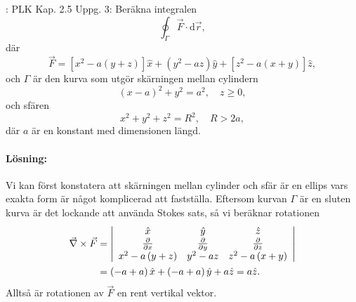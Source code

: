 \documentclass[%
oneside,                 %
final,                   %
10pt]{article}
\newcommand{\shortinlinecomment}[3]{{\color{red}{\bf #1}: #2}}
\newenvironment{notice_mdfboxadmon}[1][]{
\begin{notice_mdfboxmdframed}[frametitle=#1]
}
{
\end{notice_mdfboxmdframed}
}
\begin{document}
\begin{notice_mdfboxadmon}

\shortinlinecomment{Kommentar 2}{ PLK Kap. 2.5 Uppg. 3: }{ PLK Kap. 2.5 Uppg. }  Beräkna integralen
\begin{equation}
  \oint_\Gamma \vec{F} \cdot \mbox{d}\vec{r},
\end{equation}
där 
\begin{equation}
  \vec{F} = \left[x^2-a\left(y+z\right)\right]\hat{x} + \left(y^2-az\right)
\hat{y} + \left[z^2-a\left(x+y\right)\right] \hat{z},
\end{equation}
och $\Gamma$ är den kurva som utgör skärningen mellan cylindern
\begin{equation}
 \left(x-a\right)^2 +y^2 = a^2,\quad z \ge 0,
\end{equation}
och sfären
\begin{equation}
  x^2 + y^2 + z^2 = R^2, \quad R> 2a,
\end{equation}
där $a$ är en konstant med dimensionen längd.

\paragraph{Lösning:}
Vi kan först konstatera att skärningen mellan cylinder och sfär är en ellips vars exakta form är något komplicerad att fastställa.  Eftersom kurvan $\Gamma$ är en sluten kurva är det lockande att använda Stokes sats, så vi beräknar rotationen
\begin{align}
  \vec{\nabla} \times \vec{F} &= 
  \left|\begin{array}{ccc}
\hat{x} & \hat{y} & \hat{z} \\
\frac{\partial}{\partial x} & \frac{\partial}{\partial y} & 
\frac{\partial}{\partial z} \\
x^2-a\left(y+z\right) & y^2-az & z^2-a\left(x+y\right) \\
\end{array} 
\right| \nonumber \\
&= \left(-a+a\right) \hat{x} + \left(-a+a\right) \hat{y} + a\hat{z}
= a\hat{z}.
\end{align}
Alltså är rotationen av $\vec{F}$ en rent vertikal vektor.  


\end{notice_mdfboxadmon}
\end{document}
